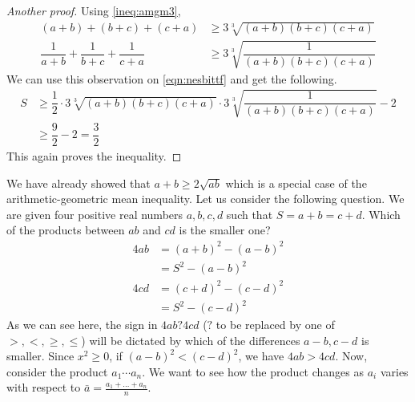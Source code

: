 \documentclass{subfile}
\begin{document}
		\begin{proof}[Another proof]
			Using \ref{ineq:amgm3},
				\begin{align*}
					(a+b)+(b+c)+(c+a)
						& \geq3\sqrt[3]{(a+b)(b+c)(c+a)}\\
					\dfrac{1}{a+b}+\dfrac{1}{b+c}+\dfrac{1}{c+a}
						& \geq3\sqrt[3]{\dfrac{1}{(a+b)(b+c)(c+a)}}
				\end{align*}
			We can use this observation on \hyperref[eqn:nesbittf]{\ref{eqn:nesbittf}} and get the following.
				\begin{align*}
					S
						& \geq\dfrac{1}{2}\cdot3\sqrt[3]{(a+b)(b+c)(c+a)}\cdot3\sqrt[3]{\dfrac{1}{(a+b)(b+c)(c+a)}}-2\\
						& \geq\dfrac{9}{2}-2=\dfrac{3}{2}
				\end{align*}
			This again proves the inequality.
		\end{proof}
	We have already showed that $a+b\geq2\sqrt{ab}$ which is a special case of the arithmetic-geometric mean inequality. Let us consider the following question. We are given four positive real numbers $a,b,c,d$ such that $S=a+b=c+d$. Which of the products between $ab$ and $cd$ is the smaller one?
		\begin{align*}
			4ab
				& = (a+b)^2-(a-b)^2\\
				& = S^2-(a-b)^2\\
			4cd
				& = (c+d)^2-(c-d)^2\\
				& = S^2-(c-d)^2
		\end{align*}
	As we can see here, the sign in $4ab?4cd$ ($?$ to be replaced by one of $>,<,\geq,\leq$) will be dictated by which of the differences $a-b,c-d$ is smaller. Since $x^2\geq0$, if $(a-b)^2<(c-d)^2$, we have $4ab>4cd$. Now, consider the product $a_1\cdots a_n$. We want to see how the product changes as $a_i$ varies with respect to $\bar{a}=\frac{a_1+\ldots+a_n}{n}$.
	
\end{document}
